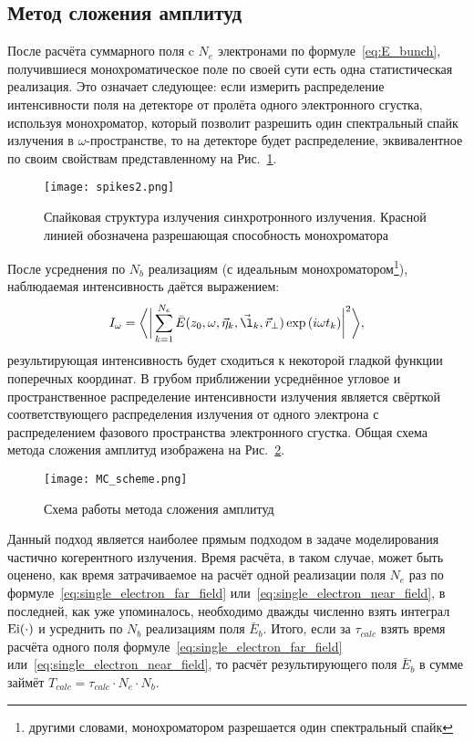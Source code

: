 \subsection{Метод сложения амплитуд}
После расчёта суммарного поля c $N_e$ электронами по формуле~\ref{eq:E_bunch}, получившиеся монохроматическое поле по своей сути есть одна статистическая реализация. Это означает следующее: если измерить распределение интенсивности поля на детекторе от пролёта одного электронного сгустка, используя монохроматор, который позволит разрешить один спектральный спайк излучения в $\omega$-пространстве, то на детекторе будет распределение, эквивалентное по своим свойствам представленному на Рис.~\ref{fig:spikes2}. 
\begin{figure}[H]
	\centering 	\texttt{[image: spikes2.png]}
	\caption{Спайковая структура излучения синхротронного излучения. Красной линией обозначена разрешающая способность монохроматора}
	\label{fig:spikes2}
\end{figure}
\noindent После усреднения по $N_b$ реализациям (с идеальным монохроматором\footnote{другими словами, монохроматором разрешается один спектральный спайк}), наблюдаемая интенсивность даётся выражением: 
\begin{align}
	I_{\omega} = \bigg \langle \bigg|\sum\limits_{k=1}^{N_e} \bar{E}(z_0, \omega, \vec{\eta}_k, \vec{\l}_k, \vec{r}_{\bot}) \exp{(i \omega t_k)}\bigg|^2 \bigg \rangle,
	\label{eq:I_MC} 
\end{align}
\noindent результирующая интенсивность будет сходиться к некоторой гладкой функции поперечных координат. В грубом приближении усреднённое угловое и пространственное распределение интенсивности излучения является свёрткой соответствующего распределения излучения от одного электрона с распределением фазового пространства электронного сгустка. Общая схема метода сложения амплитуд изображена на Рис.~\ref{fig:MC_scheme}. 
\begin{figure}[H] 
	\centering 	\texttt{[image: MC\_scheme.png]}
	\caption{Схема работы метода сложения амплитуд}
	\label{fig:MC_scheme}
\end{figure}
Данный подход является наиболее прямым подходом в задаче моделирования частично когерентного излучения. Время расчёта, в таком случае, может быть оценено, как время затрачиваемое на расчёт одной реализации поля $N_e$ раз по формуле~\ref{eq:single_electron_far_field} или~\ref{eq:single_electron_near_field}, в последней, как уже упоминалось, необходимо дважды численно взять интеграл $\textup{Ei}(\cdot)$ и усреднить по $N_b$ реализациям поля $\bar{E}_{b}$. Итого, если за $\tau_{calc}$ взять время расчёта одного поля формуле~\ref{eq:single_electron_far_field} или~\ref{eq:single_electron_near_field}, то расчёт результирующего поля $\bar{E}_{b}$ в сумме займёт $T_{calc} = \tau_{calc} \cdot N_e \cdot N_b$.

